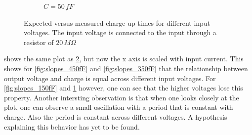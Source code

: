 \begin{figure}[h]
\begin{subfigure}[b]{0.475\textwidth}
                            \caption[]
                                {$C=50\,fF$}    
                                \label{fig:slopes_50fF}
                        \end{subfigure}
                    \caption{Expected versus measured charge up times for different input voltages. The input voltage is connected to the input through a resistor of $20\,M\Omega$}
                \label{fig:slopes}
        \end{figure}
    
     shows the same plot as \cref{fig:slopes}, but now the x axis is scaled with input current. This shows for \cref{fig:slopes_450fF} and \ref{fig:slopes_350fF} that the relationship between output voltage and charge is equal across different input voltages. For \cref{fig:slopes_150fF} and \ref{fig:slopes_50fF} however, one can see that the higher voltages lose this property. Another intersting observation is that when one looks closely at the plot, one can observe a small oscillation with a period that is constant with charge. Also the period is constant across different voltages. A hypothesis explaining this behavior has yet to be found.


